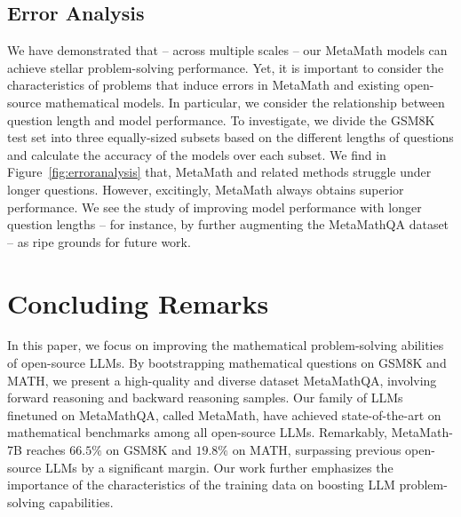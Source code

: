 \subsection{Error Analysis}

We have demonstrated that -- across multiple scales -- our MetaMath models can achieve stellar problem-solving performance. Yet, it is important to consider the characteristics of problems that induce errors in MetaMath and existing open-source mathematical models. In particular, we consider the relationship between question length and model performance. To investigate, we divide the GSM8K test set into three equally-sized subsets based on the different lengths of questions and calculate the accuracy of the models over each subset. We find in Figure~\ref{fig:erroranalysis} that, MetaMath and related methods struggle under longer questions. However, excitingly, MetaMath always obtains superior performance. We see the study of improving model performance with longer question lengths -- for instance, by further augmenting the MetaMathQA dataset -- as ripe grounds for future work. 

\section{Concluding Remarks}
\label{sec:conclusion}

 In this paper, we focus on improving the mathematical problem-solving abilities of open-source LLMs. By bootstrapping mathematical questions on GSM8K and MATH, we present a high-quality and diverse dataset {MetaMathQA}, involving forward reasoning and backward reasoning samples. Our family of LLMs finetuned on {MetaMathQA}, called {MetaMath}, have achieved state-of-the-art on mathematical benchmarks among all open-source LLMs. Remarkably, {MetaMath-7B} reaches $66.5\%$ on GSM8K and $19.8\%$ on MATH, surpassing previous open-source LLMs by a significant margin. Our work further emphasizes the importance of the characteristics of the training data on boosting LLM problem-solving capabilities.


